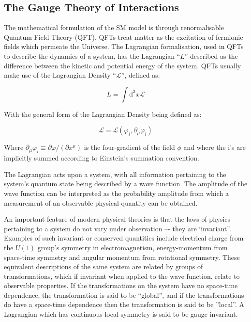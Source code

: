\subsection{The Gauge Theory of Interactions}\label{subsec:gauges}

The mathematical formulation of the SM model is through renormalisable Quantum Field Theory (QFT)\cite{LagrangiansSM}. 
QFTs treat matter as the excitation of fermionic fields which permeate the Universe. 
The Lagrangian formalisation, used in QFTs to describe the dynamics of a system, has the Lagrangian ``$L$'' described as the difference between the kinetic and potential energy of the system\cite{LagrangiansSM}. 
QFTs usually make use of the Lagrangian Density ``$\mathcal{L}$'', defined as\cite{QFT}:

\begin{equation}
L = \int \mathrm{d^{3}}x \mathcal{L}
\end{equation}

With the general form of the Lagrangian Density being defined as:

\begin{equation}
\mathcal{L} = \mathcal{L} ( \varphi_{i}, \partial _{\mu} \varphi_{i} )
\end{equation}

Where $\partial _{\mu}\varphi_{i} \equiv \partial \varphi / (\partial x^{\mu} )$ is the four-gradient of the field $\phi$ and where the i's are implicitly summed according to Einstein's summation convention\cite{ElectroweakStrong}.

The Lagrangian acts upon a system, with all information pertaining to the system's quantum state being described by a wave function. 
The amplitude of the wave function can be interpreted as the probability amplitude from which a measurement of an observable physical quantity can be obtained\cite{Isham}. 

An important feature of modern physical theories is that the laws of physics pertaining to a system do not vary under observation –- they are `invariant''. 
Examples of such invariant or conserved quantities include electrical charge from the $U(1)$ group’s symmetry in electromagnetism, energy-momentum from space-time symmetry and angular momentum from rotational symmetry\cite{Haywood}. 
These equivalent descriptions of the same system are related by groups of transformations, which if invariant when applied to the wave function, relate to observable properties\cite{QFT}. 
If the transformations on the system have no space-time dependence, the transformation is said to be ``global'', and if the transformations do have a space-time dependence then the transformation is said to be ''local''. 
A Lagrangian which has continuous local symmetry is said to be gauge invariant\cite{Haywood}. 

